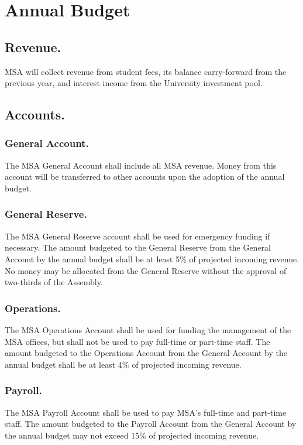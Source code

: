 \article{}

\section{Annual Budget}

\subsection{Revenue.}
MSA will collect revenue from student fees, its balance carry-forward from the previous year, and interest income from the University investment pool.  

\subsection{Accounts.} 

\subsubsection{General Account.}  The MSA General Account shall include all MSA revenue.  Money from this account will be transferred to other accounts upon the adoption of the annual budget.

\subsubsection{General Reserve.}  The MSA General Reserve account shall be used for emergency funding if necessary.  The amount budgeted to the General Reserve from the General Account by the annual budget shall be at least 5\% of projected incoming revenue.  No money may be allocated from the General Reserve without the approval of two-thirds of the Assembly.


\subsubsection{Operations.}  The MSA Operations Account shall be used for funding the management of the MSA offices, but shall not be used to pay full-time or part-time staff.  The amount budgeted to the Operations Account from the General Account by the annual budget shall be at least 4\% of projected incoming revenue.


\subsubsection{Payroll.}
The MSA Payroll Account shall be used to pay MSA's full-time and part-time staff.  The amount budgeted to the Payroll Account from the General Account by the annual budget may not exceed 15\% of projected incoming revenue.


